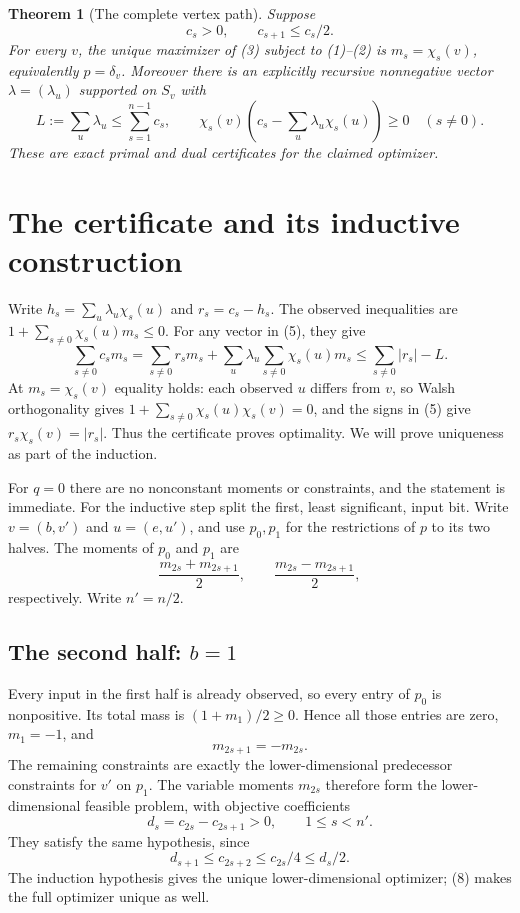 \documentclass[11pt]{article}
\newtheorem{theorem}{Theorem}\newtheorem{lemma}[theorem]{Lemma}
\begin{document}
\begin{theorem}[The complete vertex path]\label{thm:path}
Suppose
\[
                  c_s>0,\qquad c_{s+1}\le c_s/2.        \tag{4}
\]
For every $v$, the unique maximizer of (3) subject to (1)--(2) is
$m_s=\chi_s(v)$, equivalently $p=\delta_v$.
Moreover there is an explicitly recursive nonnegative vector
$\lambda=(\lambda_u)$ supported on $S_v$ with
\[
 L:=\sum_u\lambda_u\le\sum_{s=1}^{n-1}c_s,
 \qquad
 \chi_s(v)\left(c_s-\sum_u\lambda_u\chi_s(u)\right)\ge0
                    \quad(s\ne0).                      \tag{5}
\]
These are exact primal and dual certificates for the claimed optimizer.
\end{theorem}

\section{The certificate and its inductive construction}
Write $h_s=\sum_u\lambda_u\chi_s(u)$ and $r_s=c_s-h_s$.
The observed inequalities are $1+\sum_{s\ne0}\chi_s(u)m_s\le0$.
For any vector in (5), they give
\[
 \sum_{s\ne0}c_s m_s
 =\sum_{s\ne0}r_s m_s+\sum_u\lambda_u
                         \sum_{s\ne0}\chi_s(u)m_s
 \le\sum_{s\ne0}|r_s|-L.                               \tag{6}
\]
At $m_s=\chi_s(v)$ equality holds: each observed $u$ differs from $v$,
so Walsh orthogonality gives
$1+\sum_{s\ne0}\chi_s(u)\chi_s(v)=0$, and the signs in (5) give
$r_s\chi_s(v)=|r_s|$. Thus the certificate proves optimality.
We will prove uniqueness as part of the induction.

For $q=0$ there are no nonconstant moments or constraints, and the
statement is immediate. For the inductive step split the first, least
significant, input bit. Write $v=(b,v')$ and $u=(e,u')$, and use
$p_0,p_1$ for the restrictions of $p$ to its two halves. The moments of
$p_0$ and $p_1$ are
\[
       \frac{m_{2s}+m_{2s+1}}2,\qquad
       \frac{m_{2s}-m_{2s+1}}2,                         \tag{7}
\]
respectively. Write $n'=n/2$.

\subsection{The second half: $b=1$}
Every input in the first half is already observed, so every entry of
$p_0$ is nonpositive. Its total mass is $(1+m_1)/2\ge0$. Hence all
those entries are zero, $m_1=-1$, and
\[
                          m_{2s+1}=-m_{2s}.             \tag{8}
\]
The remaining constraints are exactly the lower-dimensional predecessor
constraints for $v'$ on $p_1$. The variable moments $m_{2s}$ therefore
form the lower-dimensional feasible problem, with objective coefficients
\[
                     d_s=c_{2s}-c_{2s+1}>0,
                   \qquad 1\le s<n'.                   \tag{9}
\]
They satisfy the same hypothesis, since
\[
 d_{s+1}\le c_{2s+2}\le c_{2s}/4\le d_s/2.
\]
The induction hypothesis gives the unique lower-dimensional optimizer;
(8) makes the full optimizer unique as well.
\end{document}
